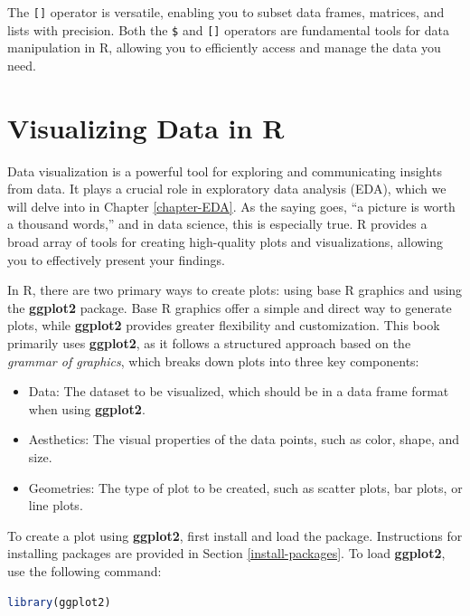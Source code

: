 \documentclass[
]{book}
\newcommand{\passthrough}[1]{#1}
\providecommand{\tightlist}{%
  \setlength{\itemsep}{0pt}\setlength{\parskip}{0pt}}
\theoremstyle{definition}
\theoremstyle{definition}
\theoremstyle{definition}
\theoremstyle{definition}
\theoremstyle{remark}
\begin{document}
The \passthrough{\lstinline![]!} operator is versatile, enabling you to subset data frames, matrices, and lists with precision. Both the \passthrough{\lstinline!$!} and \passthrough{\lstinline![]!} operators are fundamental tools for data manipulation in R, allowing you to efficiently access and manage the data you need.

\section{Visualizing Data in R}\label{visualizing-data-in-r}

Data visualization is a powerful tool for exploring and communicating insights from data. It plays a crucial role in exploratory data analysis (EDA), which we will delve into in Chapter \ref{chapter-EDA}. As the saying goes, ``a picture is worth a thousand words,'' and in data science, this is especially true. R provides a broad array of tools for creating high-quality plots and visualizations, allowing you to effectively present your findings.

In R, there are two primary ways to create plots: using base R graphics and using the \textbf{ggplot2} package. Base R graphics offer a simple and direct way to generate plots, while \textbf{ggplot2} provides greater flexibility and customization. This book primarily uses \textbf{ggplot2}, as it follows a structured approach based on the \emph{grammar of graphics}, which breaks down plots into three key components:

\begin{itemize}
\tightlist
\item
  Data: The dataset to be visualized, which should be in a data frame format when using \textbf{ggplot2}.\\
\item
  Aesthetics: The visual properties of the data points, such as color, shape, and size.\\
\item
  Geometries: The type of plot to be created, such as scatter plots, bar plots, or line plots.
\end{itemize}

To create a plot using \textbf{ggplot2}, first install and load the package. Instructions for installing packages are provided in Section \ref{install-packages}. To load \textbf{ggplot2}, use the following command:

\begin{lstlisting}[language=R]
library(ggplot2)
\end{lstlisting}
\end{document}
